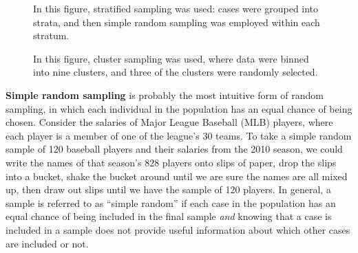 \documentclass[
  letterpaper,
  DIV=11,
  numbers=noendperiod]{scrreprt}
\begin{document}
\begin{figure}


\caption{\label{fig-stratsamp2}In this figure, stratified sampling was
used: cases were grouped into strata, and then simple random sampling
was employed within each stratum.}

\end{figure}%

\begin{figure}


\caption{\label{fig-clussamp4}In this figure, cluster sampling was used,
where data were binned into nine clusters, and three of the clusters
were randomly selected.}

\end{figure}%

\textbf{Simple random sampling} is probably the most intuitive form of
random sampling, in which each individual in the population has an equal
chance of being chosen. Consider the salaries of Major League Baseball
(MLB) players, where each player is a member of one of the league's 30
teams. To take a simple random sample of 120 baseball players and their
salaries from the 2010 season, we could write the names of that season's
828 players onto slips of paper, drop the slips into a bucket, shake the
bucket around until we are sure the names are all mixed up, then draw
out slips until we have the sample of 120 players. In general, a sample
is referred to as ``simple random'' if each case in the population has
an equal chance of being included in the final sample \emph{and} knowing
that a case is included in a sample does not provide useful information
about which other cases are included or not.
\end{document}
